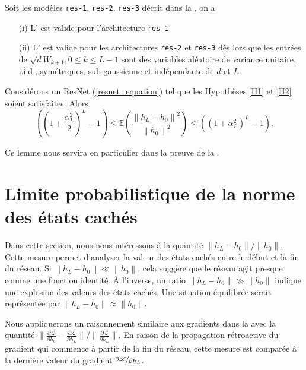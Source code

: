 \begin{proposition}[Admis]\label{prop1}
    Soit les modèles \texttt{res-1}, \texttt{res-2}, \texttt{res-3} décrit dans la , on a \begin{itemize}
        \item [(i)] L' est valide pour l'architecture \texttt{res-1}.
        \item [(ii)] L' est valide pour les architectures \texttt{res-2} et \texttt{res-3} dès lors que les entrées de $ \sqrt{d}W_{k+1}, 0 \leq k \leq L-1 $ sont des variables aléatoire de variance unitaire, i.i.d., symétriques, sub-gaussienne et indépendante de $ d $ et $ L $.
    \end{itemize}
\end{proposition}

\begin{lem}[Admis]\label{lem14}
    Considérons un ResNet (\ref{resnet_equation}) tel que les Hypothèses \ref{H1} et \ref{H2} soient satisfaites. Alors
    \[
        ((1 + \frac{\alpha _L ^2 }{2 }) ^L - 1) \leq \mathbb{E}( \frac{\left\| h_L - h_0 \right\| ^2 }{\left\| h_0 \right\| ^2}) \leq ((1 + \alpha _L ^2 ) ^L - 1 )
    .\]
\end{lem}
Ce lemme nous servira en particulier dans la preuve de la .

\section{Limite probabilistique de la norme des états cachés}

Dans cette section, nous nous intéressons à la quantité $ {\left\| h_L - h_0 \right\|} / {\left\| h_0 \right\|}$. Cette mesure permet d'analyser la valeur des états cachés entre le début et la fin du réseau. Si $\left\| h_L - h_0 \right\| \ll \left\| h_0 \right\|$, cela suggère que le réseau agit presque comme une fonction identité. À l'inverse, un ratio $\left\| h_L - h_0 \right\| \gg \left\| h_0 \right\|$ indique une explosion des valeurs des états cachés. Une situation équilibrée serait représentée par $\left\| h_L - h_0 \right\| \approx \left\| h_0 \right\|$.

Nous appliquerons un raisonnement similaire aux gradients dans la  avec la quantité ${\| \frac{\partial \mathscr{L}}{\partial h_0} - \frac{\partial \mathscr{L}}{\partial h_L} \|} / {\| \frac{\partial \mathscr{L}}{\partial h_L} \|}$. En raison de la propagation rétroactive du gradient qui commence à partir de la fin du réseau, cette mesure est comparée à la dernière valeur du gradient $\nicefrac{\partial \mathscr{L}}{\partial h_L}$.

